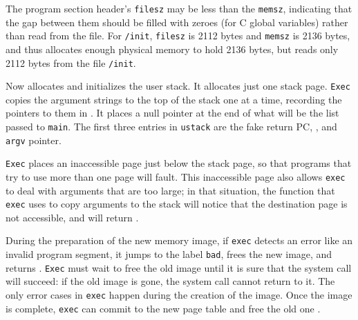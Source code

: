 The program section header's
\lstinline{filesz}
may be less than the
\lstinline{memsz},
indicating that the gap between them should be filled
with zeroes (for C global variables) rather than read from the file.
For
\lstinline{/init},
\lstinline{filesz}
is 2112 bytes and
\lstinline{memsz}
is 2136 bytes,
and thus
allocates enough physical memory to hold 2136 bytes, but reads only 2112 bytes
from the file
\lstinline{/init}.

Now
allocates and initializes the user stack.
It allocates just one stack page.
\lstinline{Exec}
copies the argument strings to the top of the stack
one at a time, recording the pointers to them in
.
It places a null pointer at the end of what will be the
list passed to
\lstinline{main}.
The first three entries in
\lstinline{ustack}
are the fake return PC,
,
and
\lstinline{argv}
pointer.

\lstinline{Exec}
places an inaccessible page just below the stack page,
so that programs that try to use more than one page will fault.
This inaccessible page also allows
\lstinline{exec}
to deal with arguments that are too large;
in that situation,
the
function that
\lstinline{exec}
uses to copy arguments to the stack will notice that
the destination page is not accessible, and will
return .

During the preparation of the new memory image,
if
\lstinline{exec}
detects an error like an invalid program segment,
it jumps to the label
\lstinline{bad},
frees the new image,
and returns .
\lstinline{Exec}
must wait to free the old image until it
is sure that the system call will succeed:
if the old image is gone,
the system call cannot return  to it.
The only error cases in
\lstinline{exec}
happen during the creation of the image.
Once the image is complete,
\lstinline{exec}
can commit to the new page table
and free the old one
.

